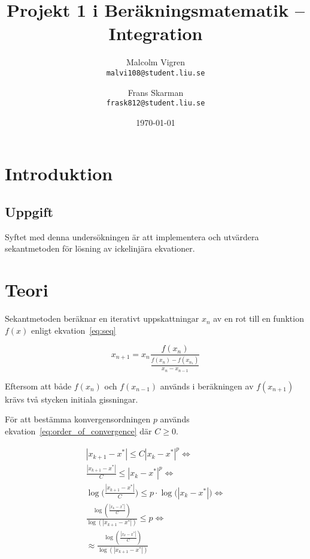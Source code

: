 \documentclass[a4paper,titlepage]{article}
\title{
    \textbf{Projekt 1 i Beräkningsmatematik -- Integration }}
\date{\today}
\author{%
    Malcolm Vigren \\
    \texttt{malvi108@student.liu.se}
    \and
    Frans Skarman\\
    \texttt{frask812@student.liu.se}
    }
\begin{document}
\maketitle
\newpage
\tableofcontents
\newpage

\section{Introduktion}

\subsection{Uppgift}

Syftet med denna undersökningen är att implementera och utvärdera sekantmetoden
för lösning av ickelinjära ekvationer.


\section{Teori}

Sekantmetoden beräknar en iterativt uppskattningar $x_n$ av en rot till en
funktion $f(x)$ enligt ekvation~\ref{eq:seq}

\begin{equation}
    \label{eq:seq}
    x_{n+1} = x_{n}
    \frac{f(x_n)}
        {\frac{f(x_n) - f(x_{n_1})}
                {x_n - x_{n-1}}
        }
\end{equation}

Eftersom att både $f(x_n)$ och $f(x_{n-1})$ används i beräkningen av $f(x_{n+1})$ krävs
två stycken initiala gissningar.


För att bestämma konvergensordningen $p$ används ekvation~\ref{eq:order_of_convergence} där
$C \geq 0$.

\begin{equation}
    \begin{gathered}
        |x_{k+1} - x^*| \leq C |x_k - x^*|^p \Leftrightarrow \\
        \frac{|x_{k+1} - x^*|}{C} \leq |x_{k} - x^*|^p \Leftrightarrow \\
        \log\big(\frac{|x_{k+1} - x^*|}{C} \big) \leq
            p \cdot \log\big(|x_{k} - x^*|\big) \Leftrightarrow \\
        \frac{\log(\frac{|x_{k} - x^*|}{C})}
            {\log(|x_{k+1} - x^*|)} \leq p \Leftrightarrow \\
        \approx \frac{\log(\frac{|x_{k} - x^*|}{C})}
            {\log(|x_{k+1} - x^*|)}
    \end{gathered}
    \label{eq:order_of_convergence}
\end{equation}
\end{document}
